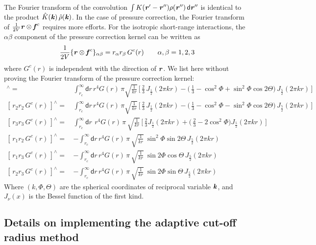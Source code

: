 \documentclass[aps,pre,preprint]{revtex4}
\renewcommand{\v}[1]{\textbf{\textit{#1}}}
\renewcommand{\d}[1]{\textsf{#1}}
\begin{document}
The Fourier transform of the convolution $\int K(\v r' - \v r'')
\rho(\v r'')\,\d d\v r''$ is identical to the product $\hat K(\v
k)\,\hat \rho(\v k)$. In the case of pressure correction, the Fourier
transform of $\frac{1}{2V}\v r\otimes\v f^c$ requires more efforts.
For the isotropic short-range interactions, the $\alpha\beta$
component of the pressure correction kernel can be written as
\begin{align}
  \frac1{2V}\{\v r\otimes\v f^c\}_{\alpha\beta} =
  r_\alpha r_\beta \,G^c(r) \qquad \alpha, \beta = 1, 2, 3
\end{align}
where $G^c(r)$ is independent with the direction of $\v r$.  We list
here without proving the Fourier transform of the pressure correction
kernel:
\begin{align}
  [\,r_1r_1\,G^c(r)\,]^{\wedge} 
  =\,& 
  \int_{r_c}^\infty \d dr\, r^4 G(r)\,
  \pi \sqrt{ \frac1{kr} }\,
  \Big[\,
  \frac23\,J_{\frac12}(2\pi kr) -
  \big(\,
  \frac13 -
  \cos^2\Phi +
  \sin^2\Phi\cos2\Theta
  \big)\, J_{\frac52}(2\pi kr)
  \,\Big] \\
  [\,r_2 r_2\,G^c(r)\,]^{\wedge} 
  =\,& 
  \int_{r_c}^\infty \d dr\, r^4 G(r)\,
  \pi \sqrt{ \frac1{kr} }\,
  \Big[\,
  \frac23\,J_{\frac12}(2\pi kr) -
  \big(\,
  \frac13 -
  \cos^2\Phi -
  \sin^2\Phi\cos2\Theta
  \big)\, J_{\frac52}(2\pi kr)
  \,\Big]   \\
  [\,r_3 r_3\,G^c(r)\,]^{\wedge} 
  =\,& 
  \int_{r_c}^\infty \d dr\: \,r^4 G(r)\,\pi\,
  \sqrt{ \frac1{kr} }\,
  \Big[\,
  \frac23 J_{\frac12}(2\pi kr) +
  \big(\,
  \frac23 - 2\cos^2\Phi
  \big)
  J_{\frac52}(2\pi kr)
  \,\Big]\\
  [\,r_1 r_2\,G^c(r)\,]^{\wedge} 
  =\,& -
  \int_{r_c}^\infty
  \d dr\,
  r^4G(r)\,\pi\,
  \sqrt{\frac1{kr}}\:
  \sin^2\Phi\sin 2\Theta\,J_{\frac52}(2\pi kr)\\
  [\,r_1 r_3\,G^c(r)\,]^{\wedge} 
  =\,& -
  \int_{r_c}^\infty
  \d dr\,
  r^4G(r)\,\pi\,
  \sqrt{\frac1{kr}}\:
  \sin2\Phi\cos\Theta\,J_{\frac52}(2\pi kr)\\
  [\,r_2 r_3\,G^c(r)\,]^{\wedge} 
  =\,& -
  \int_{r_c}^\infty
  \d dr\,
  r^4G(r)\,\pi\,
  \sqrt{\frac1{kr}}\:
  \sin2\Phi\sin\Theta\,J_{\frac52}(2\pi kr)
\end{align}
Where $(k, \Phi, \Theta)$ are the spherical coordinates of reciprocal
variable $\v k$, and $J_\nu(x)$ is the Bessel function of the first
kind.


\subsection{Details on implementing the adaptive cut-off radius
  method}
\end{document}

